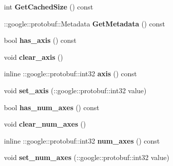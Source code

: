 \begin{DoxyCompactItemize}
int {\bfseries Get\+Cached\+Size} () const
\item 
\mbox{\label{classcaffe_1_1_scale_parameter_aafdbd05a6ec7d0569e156db1584b1f18}} 
\+::google\+::protobuf\+::\+Metadata {\bfseries Get\+Metadata} () const
\item 
\mbox{\label{classcaffe_1_1_scale_parameter_a7caca94c1594bb34d0610252471979ed}} 
bool {\bfseries has\+\_\+axis} () const
\item 
\mbox{\label{classcaffe_1_1_scale_parameter_a21136c30a0d8208382ec793c7f54c98d}} 
void {\bfseries clear\+\_\+axis} ()
\item 
\mbox{\label{classcaffe_1_1_scale_parameter_aec96526c966636d0fa8e3c2c20f56f9c}} 
inline \+::google\+::protobuf\+::int32 {\bfseries axis} () const
\item 
\mbox{\label{classcaffe_1_1_scale_parameter_adf1ed4003a143ecd4d2994e9a1bff730}} 
void {\bfseries set\+\_\+axis} (\+::google\+::protobuf\+::int32 value)
\item 
\mbox{\label{classcaffe_1_1_scale_parameter_a6b27f473e9cecae8243fadbc79aaf089}} 
bool {\bfseries has\+\_\+num\+\_\+axes} () const
\item 
\mbox{\label{classcaffe_1_1_scale_parameter_a4e1f4f421d75935b1023121dbdebc80f}} 
void {\bfseries clear\+\_\+num\+\_\+axes} ()
\item 
\mbox{\label{classcaffe_1_1_scale_parameter_afebc3c25f18a102fc70db7ef15c00f2a}} 
inline \+::google\+::protobuf\+::int32 {\bfseries num\+\_\+axes} () const
\item 
\mbox{\label{classcaffe_1_1_scale_parameter_a23de22c20e50667fdac89c2ff47d9484}} 
void {\bfseries set\+\_\+num\+\_\+axes} (\+::google\+::protobuf\+::int32 value)
\item 
\mbox{\label{classcaffe_1_1_scale_parameter_a07d7a4fb85a2e7e01a123bf78758976f}} 

\end{DoxyCompactItemize}
